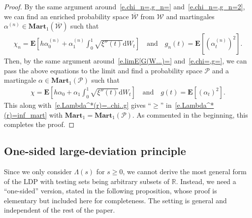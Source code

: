 \documentclass[11pt]{amsart}
\theoremstyle{remark}
\theoremstyle{definition}
\numberwithin{equation}{section}
\numberwithin{proposition}{section}
\numberwithin{figure}{section}
\numberwithin{table}{section}
\newcommand{\R}{\mathbb{R}}
\newcommand{\EE}{\mathbf{E}}
\renewcommand{\geq}{\geqslant}
\renewcommand{\bar}{\overline}
\newcommand{\Ll}{\left}
\newcommand{\Rr}{\right}
\renewcommand{\d}{\mathrm{d}}
\newcommand{\1}{\mathbf{1}}
\newcommand{\msc}{\mathscr}
\newcommand{\bmart}{\mathbf{Mart}}
\newcommand{\pnp}{{(n)}}
\begin{document}
\begin{proof}
By the same argument around~\eqref{e.chi_n=,g_n=} and~\eqref{e.chi_n=,g_n=2}, we can find an enriched probability space $\bar{\msc W}$ from $\msc W$ and martingales $\alpha^\pnp \in\bmart_1(\bar{\msc W})$ such that
\begin{align*}
    \chi_n=\EE\Ll[h\alpha^\pnp_0 + \alpha^\pnp_1\int_0^1\sqrt{\xi''(t)}\d W_t\Rr] \quad\text{and}\quad 
    g_n(t)  =\EE \Ll[\Ll(\alpha^\pnp_t\Rr)^2\Rr].
\end{align*}
Then, by the same argument around~\eqref{e.limE[G(W...)=} and~\eqref{e.chi=,g=}, we can pass the above equations to the limit and find a probability space $\msc P$ and a martingale $\alpha\in\bmart_1(\msc P)$ such that
\begin{align*}
    \chi=\EE\Ll[h\alpha_0 + \alpha_1\int_0^1\sqrt{\xi''(t)}\d W_t\Rr] \quad\text{and}\quad 
    g(t)  =\EE \Ll[\Ll(\alpha_t\Rr)^2\Rr].
\end{align*}
This along with~\eqref{e.Lambda^*(r)=..chi..g} gives ``$\geq$'' in~\eqref{e.Lambda^*(r)=inf_mart} with $\bmart_1 = \bmart_1(\msc P)$.
As commented in the beginning, this completes the proof.
\end{proof}


\subsection{One-sided large-deviation principle}

Since we only consider $\Lambda(s)$ for $s\geq0$, we cannot derive the most general form of the LDP with testing sets being arbitrary subsets of $\R$. Instead, we need a ``one-sided'' version, stated in the following proposition, whose proof is elementary but included here for completeness. 
The setting is general and independent of the rest of the paper.
\end{document}
